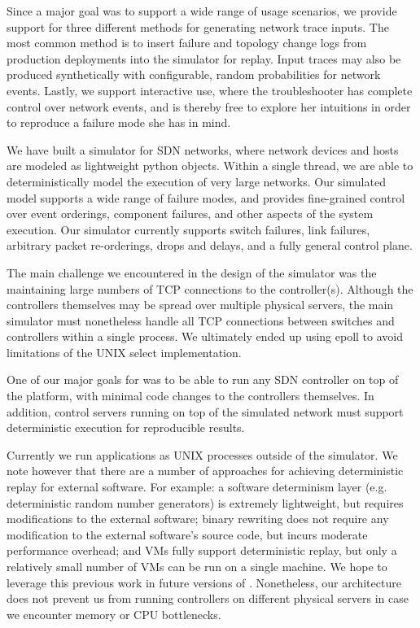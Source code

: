  Since a major goal \projectname{} was
to support a wide range of usage scenarios, %
we provide support for three different methods for generating network trace
inputs. The most common method is to insert failure and topology change logs
from production deployments into the simulator for replay. Input traces may
also be produced synthetically with configurable, random probabilities for
network events. Lastly, we support interactive use, where the troubleshooter
has complete control over network events, and is thereby free to explore her
intuitions in order to reproduce a failure mode she has in mind.

 We have built a simulator for SDN networks,
where network devices and hosts are modeled as lightweight python objects. Within a single thread, we
are able to deterministically model the execution of very large networks.
Our simulated model supports a wide
range of failure modes, and provides fine-grained control over event
orderings, component failures, and other aspects of the system execution. Our
simulator currently supports switch failures, link failures, arbitrary packet
re-orderings, drops and delays, and a fully general control plane.

The main challenge we encountered in the design of the simulator was the
maintaining large numbers of TCP connections to the
controller(s). Although the controllers themselves may be spread
over multiple physical servers, the main simulator must nonetheless handle all
TCP connections between switches and controllers within a single process.
We ultimately ended up using epoll to avoid limitations of the UNIX select
implementation.

 One of our major goals for \projectname{}
was to be able to run any SDN controller on top of the platform, with minimal
code changes to the controllers themselves. In addition, control servers
running on top of the simulated network must support deterministic execution
for reproducible results.

Currently we run applications as UNIX processes outside of the simulator.
We note however that there are a number of approaches for achieving deterministic
replay for external software. For example: a software determinism layer (e.g.
deterministic random number generators) is
extremely lightweight, but requires modifications to the external software;
binary rewriting does not require any modification to the external
software's source code, but incurs moderate performance overhead; and VMs
fully support deterministic replay, but only a relatively small number of VMs can be run
on a single machine. We hope to leverage this previous work in future versions
of \projectname{}. Nonetheless, our architecture does not prevent us from
running controllers on different physical
servers in case we encounter memory or CPU bottlenecks.

